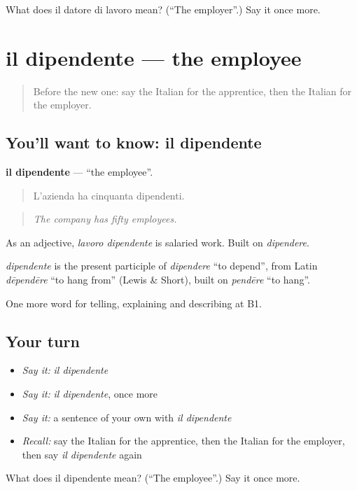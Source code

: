 \begin{tcolorbox}[breakable,colback=teal!4,colframe=teal!35!black,title={Before you move on}]
What does il datore di lavoro mean? (\textquotedblleft{}The employer\textquotedblright{}.) Say it once more.
\end{tcolorbox}
\section[il dipendente]{il dipendente — the employee}

\label{lesson:IT-C358-dipendente}



\begin{quote}
Before the new one: say the Italian for the apprentice, then the Italian for the employer.
\end{quote}

\subsection*{You'll want to know: il dipendente}
\textbf{il dipendente} — \textquotedblleft{}the employee\textquotedblright{}.

\begin{quote}
L'azienda ha cinquanta dipendenti.
\end{quote}

\begin{quote}
\emph{The company has fifty employees.}
\end{quote}

As an adjective, \emph{lavoro dipendente} is salaried work. Built on \emph{dipendere}.

\begin{cousinweb}
\emph{dipendente} is the present participle of \emph{dipendere} \textquotedblleft{}to depend\textquotedblright{}, from Latin \emph{dēpendēre} \textquotedblleft{}to hang from\textquotedblright{} (Lewis \& Short), built on \emph{pendēre} \textquotedblleft{}to hang\textquotedblright{}.
\end{cousinweb}

\begin{grammarlens}[title={What you've built}]
One more word for telling, explaining and describing at B1.
\end{grammarlens}

\subsection*{Your turn}
\begin{itemize}
\raggedright
  \item \emph{Say it:} \emph{il dipendente}
  \item \emph{Say it:} \emph{il dipendente}, once more
  \item \emph{Say it:} a sentence of your own with \emph{il dipendente}
  \item \emph{Recall:} say the Italian for the apprentice, then the Italian for the employer, then say \emph{il dipendente} again
\end{itemize}

\begin{tcolorbox}[breakable,colback=teal!4,colframe=teal!35!black,title={Before you move on}]
What does il dipendente mean? (\textquotedblleft{}The employee\textquotedblright{}.) Say it once more.
\end{tcolorbox}
